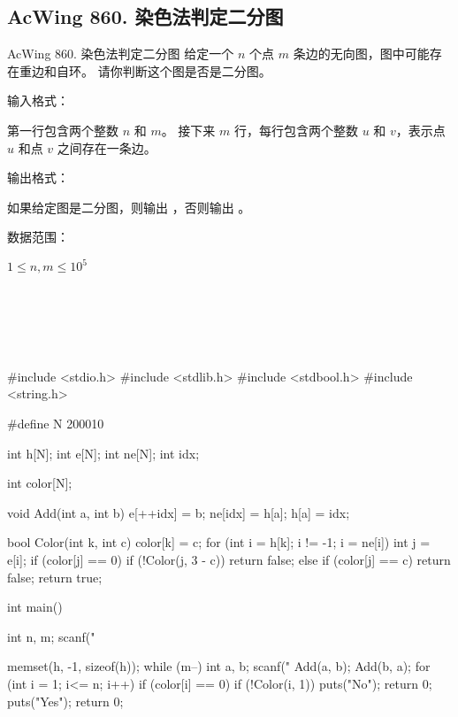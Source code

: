 \subsection{AcWing 860. 染色法判定二分图}
\begin{titledbox}{AcWing 860. 染色法判定二分图}
    给定一个 $n$ 个点 $m$ 条边的无向图，图中可能存在重边和自环。 请你判断这个图是否是二分图。

    输入格式：

    第一行包含两个整数 $n$ 和 $m$。 接下来 $m$ 行，每行包含两个整数 $u$ 和 $v$，表示点 $u$ 和点 $v$ 之间存在一条边。

    输出格式：

    如果给定图是二分图，则输出 ，否则输出 。

    数据范围：

    $1 \le n,m \le 10^5$

    \begin{inputblock}
         \\
         \\
         \\
         \\
    \end{inputblock}
    \begin{outputblock}
    \end{outputblock}
\end{titledbox}

\begin{mycpptwocol}[染色法判定二分图]
    #include <stdio.h>
    #include <stdlib.h>
    #include <stdbool.h>
    #include <string.h>

    #define N 200010

    int h[N];
    int e[N];
    int ne[N];
    int idx;

    int color[N];

    void Add(int a, int b) {
        e[++idx] = b;
        ne[idx] = h[a];
        h[a] = idx;
    }

    bool Color(int k, int c) {
        color[k] = c;
        for (int i = h[k]; i != -1; i = ne[i]) {
            int j = e[i];
            if (color[j] == 0) {
                if (!Color(j, 3 - c)) {
                    return false;
                }
            } else if (color[j] == c) {
                return false;
            }
        }
        return true;
    }

    int main() {
        int n, m;
        scanf("%

        memset(h, -1, sizeof(h));
        while (m--) {
            int a, b;
            scanf("%
            Add(a, b);
            Add(b, a);
        }
        for (int i = 1; i<= n; i++) {
            if (color[i] == 0) {
                if (!Color(i, 1)) {
                    puts("No");
                    return 0;
                }
            }
        }
        puts("Yes");
        return 0;
    }
\end{mycpptwocol}


